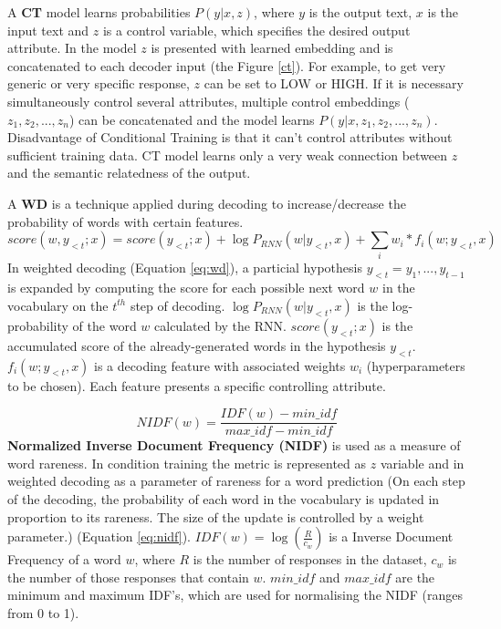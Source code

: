 A \textbf{CT} model learns probabilities $P(y|x,z)$, where $y$ is the output text, $x$ is the input text and $z$ is a control variable, which specifies the desired output attribute. In the model $z$ is presented with learned embedding and is concatenated to each decoder input (the Figure \ref{ct}). For example, to get very generic or very specific response, $z$ can be set to LOW or HIGH. If it is necessary simultaneously control several attributes, multiple control embeddings ($z_1, z_2, ..., z_n$) can be concatenated and the model learns $P(y|x, z_1, z_2, ..., z_n)$. Disadvantage of Conditional Training is that it can’t control attributes without sufficient training data. CT model learns only a very weak connection between $z$ and the semantic relatedness of the output.

A \textbf{WD} is a technique applied during decoding to increase/decrease the probability of words with certain features. 
\begin{equation} \label{eq:wd}
score(w, y_{<t}; x) = score(y_{<t}; x) + \log P_{RNN}(w|y_{<t}, x) + \sum_i w_i * f_i(w; y_{<t}, x)
\end{equation}
In weighted decoding (Equation \ref{eq:wd}), a particial hypothesis $y_{<t} = y_1, ..., y_{t-1}$ is expanded by computing the score for each possible next word $w$ in the vocabulary on the $t^{th}$ step of decoding. $\log P_{RNN}(w|y_{<t}, x)$ is the log-probability of the word $w$ calculated by the RNN. $score(y_{<t}; x)$ is the accumulated score of the already-generated words in the hypothesis $y_{<t}$. $f_i(w; y_{<t}, x)$ is a decoding feature with associated weights $w_i$ (hyperparameters to be chosen). Each feature presents a specific controlling attribute.

\begin{equation} \label{eq:nidf}
NIDF(w) = \frac{IDF(w) - min\_idf}{max\_idf - min\_idf}
\end{equation}
\textbf{Normalized Inverse Document Frequency (NIDF)} is used as a measure of word rareness. In condition training the metric is represented as $z$ variable and in weighted decoding as a parameter of rareness for a word prediction (On each step of the decoding, the probability of each word in the vocabulary is updated in proportion to its rareness. The size of the update is controlled by a weight parameter.) (Equation \ref{eq:nidf}). $IDF(w) = \log(\frac{R}{c_w})$ is a Inverse Document Frequency of a word $w$, where $R$ is the number of responses in the dataset, $c_w$ is the number of those responses that contain $w$. $min\_idf$ and $max\_idf$ are the minimum and maximum IDF's, which are used for normalising the NIDF (ranges from 0 to 1).

